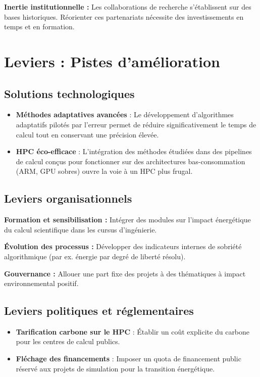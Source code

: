 \documentclass[11pt,a4paper]{article}
\begin{document}
\textbf{Inertie institutionnelle :} Les collaborations de recherche s'établissent sur des bases historiques. Réorienter ces partenariats nécessite des investissements en temps et en formation.

\section{Leviers : Pistes d'amélioration}

\subsection{Solutions technologiques}

\begin{itemize}
    \item \textbf{Méthodes adaptatives avancées} : Le développement d’algorithmes adaptatifs pilotés par l’erreur permet de réduire significativement le temps de calcul tout en conservant une précision élevée.
    
    \item \textbf{HPC éco-efficace} : L’intégration des méthodes étudiées dans des pipelines de calcul conçus pour fonctionner sur des architectures bas-consommation (ARM, GPU sobres) ouvre la voie à un HPC plus frugal.
\end{itemize}

\subsection{Leviers organisationnels}

\textbf{Formation et sensibilisation :} Intégrer des modules sur l’impact énergétique du calcul scientifique dans les cursus d’ingénierie.

\textbf{Évolution des processus :} Développer des indicateurs internes de sobriété algorithmique (par ex. énergie par degré de liberté résolu).

\textbf{Gouvernance :} Allouer une part fixe des projets à des thématiques à impact environnemental positif.

\subsection{Leviers politiques et réglementaires}

\begin{itemize}
    \item \textbf{Tarification carbone sur le HPC} : Établir un coût explicite du carbone pour les centres de calcul publics.

    \item \textbf{Fléchage des financements} : Imposer un quota de financement public réservé aux projets de simulation pour la transition énergétique.
\end{itemize}
\end{document}
